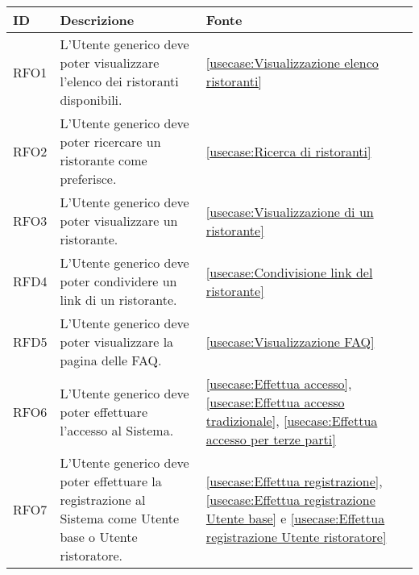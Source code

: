 \begin{table}[H]
	\renewcommand{\arraystretch}{1.5}
	\centering
	\begin{tabularx}{\textwidth}{l|X|p{2cm}}
		\textbf{ID} & \textbf{Descrizione}                                                                                       & \textbf{Fonte}                                                                                                                                               \\
		\hline
		RFO1        & L'Utente generico deve poter visualizzare l'elenco dei ristoranti disponibili.                             & \autoref{usecase:Visualizzazione elenco ristoranti}                                                                                                          \\
		\hline
		RFO2        & L'Utente generico deve poter ricercare un ristorante come preferisce.                                      & \autoref{usecase:Ricerca di ristoranti}                                                                                                                      \\
		\hline
		RFO3        & L'Utente generico deve poter visualizzare un ristorante.                                                   & \autoref{usecase:Visualizzazione di un ristorante}                                                                                                           \\
		\hline
		RFD4        & L'Utente generico deve poter condividere un link di un ristorante.                                         & \autoref{usecase:Condivisione link del ristorante}                                                                                                           \\
		\hline
		RFD5        & L'Utente generico deve poter visualizzare la pagina delle FAQ.                                             & \autoref{usecase:Visualizzazione FAQ}                                                                                                                        \\
		\hline
		RFO6        & L'Utente generico deve poter effettuare l'accesso al Sistema.                                              & \autoref{usecase:Effettua accesso}, \autoref{usecase:Effettua accesso tradizionale}, \autoref{usecase:Effettua accesso per terze parti}                      \\
		\hline
		RFO7        & L'Utente generico deve poter effettuare la registrazione al Sistema come Utente base o Utente ristoratore. & \autoref{usecase:Effettua registrazione}, \autoref{usecase:Effettua registrazione Utente base} e \autoref{usecase:Effettua registrazione Utente ristoratore} \\

\end{tabularx}
\end{table}
